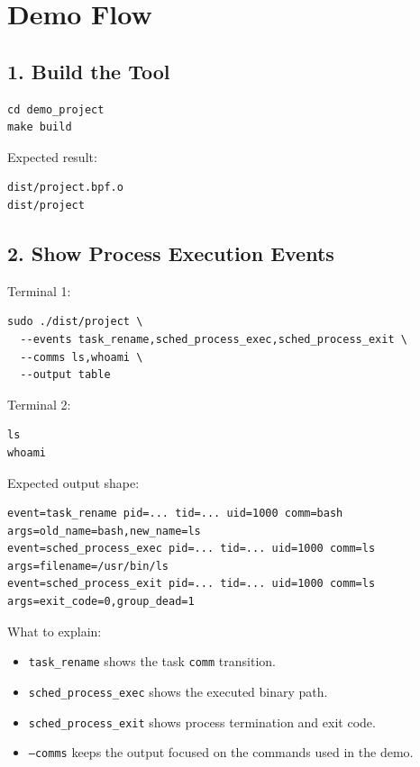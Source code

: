 \documentclass[11pt,a4paper]{article}
\begin{document}
\section{Demo Flow}

\subsection{1. Build the Tool}

\begin{lstlisting}[style=terminal]
cd demo_project
make build
\end{lstlisting}

Expected result:

\begin{lstlisting}[style=terminal]
dist/project.bpf.o
dist/project
\end{lstlisting}

\subsection{2. Show Process Execution Events}

Terminal 1:

\begin{lstlisting}[style=terminal]
sudo ./dist/project \
  --events task_rename,sched_process_exec,sched_process_exit \
  --comms ls,whoami \
  --output table
\end{lstlisting}

Terminal 2:

\begin{lstlisting}[style=terminal]
ls
whoami
\end{lstlisting}

Expected output shape:

\begin{lstlisting}[style=terminal]
event=task_rename pid=... tid=... uid=1000 comm=bash args=old_name=bash,new_name=ls
event=sched_process_exec pid=... tid=... uid=1000 comm=ls args=filename=/usr/bin/ls
event=sched_process_exit pid=... tid=... uid=1000 comm=ls args=exit_code=0,group_dead=1
\end{lstlisting}

What to explain:

\begin{itemize}
  \item \texttt{task\_rename} shows the task \texttt{comm} transition.
  \item \texttt{sched\_process\_exec} shows the executed binary path.
  \item \texttt{sched\_process\_exit} shows process termination and exit code.
  \item \texttt{--comms} keeps the output focused on the commands used in the demo.
\end{itemize}
\end{document}
